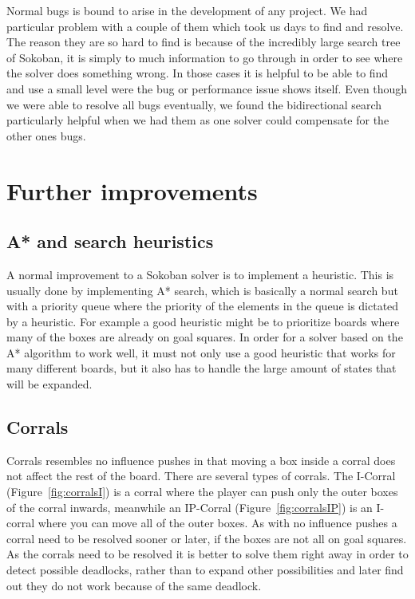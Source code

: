 \documentclass[a4paper,11pt]{article}
\renewcommand{\*}[0]{\cdot}
\begin{document}

Normal bugs is bound to arise in the development of any project. We had
particular problem with a couple of them which took us days to find and resolve.
The reason they are so hard to find is because of the incredibly large search
tree of Sokoban, it is simply to much information to go through in order to see
where the solver does something wrong. In those cases it is helpful to be able
to find and use a small level were the bug or performance issue shows itself.
Even though we were able to resolve all bugs eventually, we found the
bidirectional search particularly helpful when we had them as one solver could
compensate for the other ones bugs.


\section{Further improvements}

\subsection{A* and search heuristics}

A normal improvement to a Sokoban solver is to implement a heuristic. This is
usually done by implementing A* search, which is basically a normal search but
with a priority queue where the priority of the elements in the queue is
dictated by a heuristic. For example a good heuristic might be to prioritize
boards where many of the boxes are already on goal squares. In order for a
solver based on the A* algorithm to work well, it must not only use a good
heuristic that works for many different boards, but it also has to handle the
large amount of states that will be expanded.


\subsection{Corrals}

Corrals resembles no influence pushes in that moving a box inside a corral does
not affect the rest of the board.  There are several types of corrals. The
I-Corral (Figure~\ref{fig:corralsI}) is a corral where the player can push only
the outer boxes of the corral inwards, meanwhile an IP-Corral
(Figure~\ref{fig:corralsIP}) is an I-corral where you can move all of the outer
boxes. As with no influence pushes a corral need to be resolved sooner or later,
if the boxes are not all on goal squares.  As the corrals need to be resolved it
is better to solve them right away in order to detect possible deadlocks, rather
than to expand other possibilities and later find out they do not work because
of the same deadlock.
\end{document}

